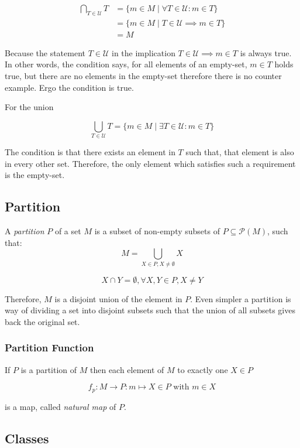 \begin{align*}
	\bigcap_{T \in \mathcal{U}} T &= \{m \in M \mid \forall T \in \mathcal{U} : m \in T\} \\ 
								  &= \{m \in M \mid T \in \mathcal{U} \implies m \in T\} \\ 
								  &= M
\end{align*}

Because the statement \(T \in \mathcal{U}\) in the implication \(T \in \mathcal{U} \implies m \in T\) is 
always true. In other words, the condition says, for all elements of an empty-set, \(m \in T\) holds true, but there are no 
elements in the empty-set therefore there is no counter example. Ergo the condition is true.

For the union 

\[
	\bigcup_{T \in \mathcal{U}} T = \{m \in M \mid \exists T \in \mathcal{U} : m \in T \}
\]

The condition is that there exists an element in \(T\) such that, that element is also in every other set. Therefore, the only 
element which satisfies such a requirement is the empty-set.

\QED

\subsection{Partition}

A \emph{partition} \(P\) of a set \(M\) is a subset of non-empty subsets of \(P \subseteq \mathcal{P} (M)\), such that:
\[
	M = \bigcup_{X \in P, X \ne \emptyset} X 
\]

\[
	X \cap Y = \emptyset, \forall X, Y \in P, X \ne Y
\]

Therefore, \(M\) is a disjoint union of the element in \(P\). Even simpler a partition is way 
of dividing a set into disjoint subsets such that the union of all subsets gives back the original set.

\subsubsection{Partition Function}

If \(P\) is a partition of \(M\) then each element of \(M\) to exactly one \(X \in P\)

\[
	f_p : M \to P : m \mapsto X \in P \text{ with }m \in X
\]

is a map, called \emph{natural map} of \(P\).

\subsection{Classes}

